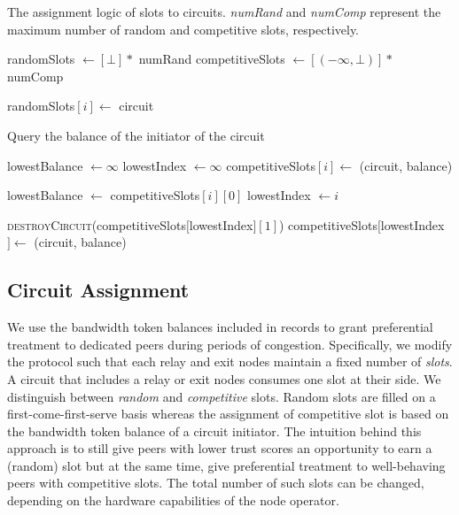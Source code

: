 \begin{algorithm}[!t]
	\caption{The assignment logic of slots to circuits. \emph{numRand} and \emph{numComp} represent the maximum number of random and competitive slots, respectively.}
	\label{alg:slot_logic}
	\begin{algorithmic}[1]
		\State randomSlots $ \leftarrow [\bot] * $ numRand
		\State competitiveSlots $ \leftarrow [(-\infty, \bot)] * $ numComp
		\State
		
		\State randomSlots$[i] \leftarrow $ circuit
		\State \Return
		\EndIf
		\EndFor
		
		\State Query the balance of the initiator of the circuit
		
		\EndFunction
		\State
		
		\State lowestBalance $ \leftarrow \infty $
		\State lowestIndex $ \leftarrow \infty $
		\State competitiveSlots$[i] \leftarrow $ (circuit, balance)
		\State \Return
		\EndIf
		
		\State lowestBalance $ \leftarrow $ competitiveSlots$[i][0] $
		\State lowestIndex $ \leftarrow i $
		\EndIf
		\EndFor
		
		\State \textsc{destroyCircuit}(competitiveSlots$[$lowestIndex$][1] $)
		\State competitiveSlots$[$lowestIndex$] \leftarrow $ (circuit, balance)
		\EndIf
		
		\EndFunction
		
	\end{algorithmic}
\end{algorithm}

\subsection{Circuit Assignment}
We use the bandwidth token balances included in \TrustChain{} records to grant preferential treatment to dedicated peers during periods of congestion.
Specifically, we modify the \Tribler{} protocol such that each relay and exit nodes maintain a fixed number of \emph{slots}.
A circuit that includes a relay or exit nodes consumes one slot at their side.
We distinguish between \emph{random} and \emph{competitive} slots.
Random slots are filled on a first-come-first-serve basis whereas the assignment of competitive slot is based on the bandwidth token balance of a circuit initiator.
The intuition behind this approach is to still give peers with lower trust scores an opportunity to earn a (random) slot but at the same time, give preferential treatment to well-behaving peers with competitive slots.
The total number of such slots can be changed, depending on the hardware capabilities of the node operator.


